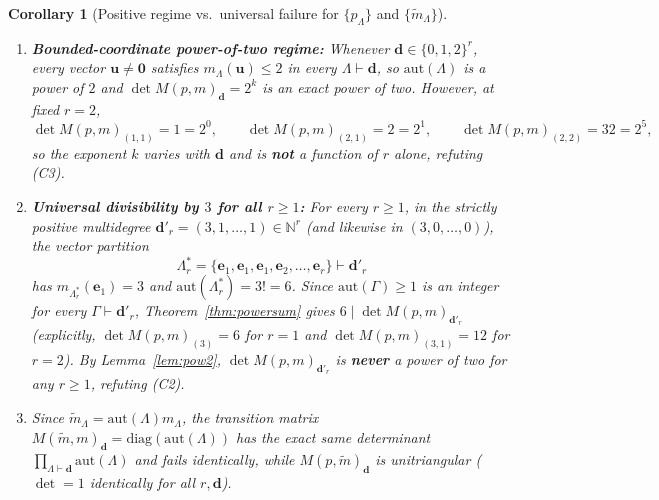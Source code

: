 \documentclass[11pt,a4paper]{article}
\newtheorem{corollary}[theorem]{Corollary}
\theoremstyle{definition}
\theoremstyle{remark}
\newcommand{\NN}{\mathbb{N}}
\newcommand{\aut}{\mathrm{aut}}
\newcommand{\vecd}{\mathbf{d}}
\newcommand{\vecu}{\mathbf{u}}
\newcommand{\vece}{\mathbf{e}}
\begin{document}
\begin{corollary}[Positive regime vs.\ universal failure for $\{p_\Lambda\}$ and $\{\tilde{m}_\Lambda\}$]\label{cor:powersum-disproof}
\leavevmode
\begin{enumerate}
  \setlength{\itemsep}{2pt}
  \item[(a)] \textbf{Bounded-coordinate power-of-two regime:} Whenever $\vecd \in \{0,1,2\}^r$, every vector $\vecu \neq \mathbf{0}$ satisfies $m_\Lambda(\vecu) \le 2$ in every $\Lambda \vdash \vecd$, so $\aut(\Lambda)$ is a power of $2$ and $\det M(p,m)_{\vecd} = 2^k$ is an exact power of two. However, at fixed $r = 2$,
  \[
    \det M(p,m)_{(1,1)} = 1 = 2^0, \qquad
    \det M(p,m)_{(2,1)} = 2 = 2^1, \qquad
    \det M(p,m)_{(2,2)} = 32 = 2^5,
  \]
  so the exponent $k$ varies with $\vecd$ and is \textbf{not} a function of $r$ alone, refuting \emph{(C3)}.
  \item[(b)] \textbf{Universal divisibility by $3$ for all $r \ge 1$:} For every $r \ge 1$, in the strictly positive multidegree $\vecd'_r = (3, 1, \dots, 1) \in \NN^r$ (and likewise in $(3, 0, \dots, 0)$), the vector partition
  \[
    \Lambda^*_r = \{\vece_1, \vece_1, \vece_1, \vece_2, \dots, \vece_r\} \vdash \vecd'_r
  \]
  has $m_{\Lambda^*_r}(\vece_1) = 3$ and $\aut(\Lambda^*_r) = 3! = 6$. Since $\aut(\Gamma) \ge 1$ is an integer for every $\Gamma \vdash \vecd'_r$, Theorem~\ref{thm:powersum} gives $6 \mid \det M(p,m)_{\vecd'_r}$ (explicitly, $\det M(p,m)_{(3)} = 6$ for $r = 1$ and $\det M(p,m)_{(3,1)} = 12$ for $r = 2$). By Lemma~\ref{lem:pow2}, $\det M(p,m)_{\vecd'_r}$ is \textbf{never} a power of two for any $r \ge 1$, refuting \emph{(C2)}.
  \item[(c)] Since $\tilde{m}_\Lambda = \aut(\Lambda) m_\Lambda$, the transition matrix $M(\tilde{m},m)_{\vecd} = \mathrm{diag}(\aut(\Lambda))$ has the exact same determinant $\prod_{\Lambda \vdash \vecd} \aut(\Lambda)$ and fails identically, while $M(p,\tilde{m})_{\vecd}$ is unitriangular ($\det = 1$ identically for all $r, \vecd$).
\end{enumerate}
\end{corollary}
\end{document}

